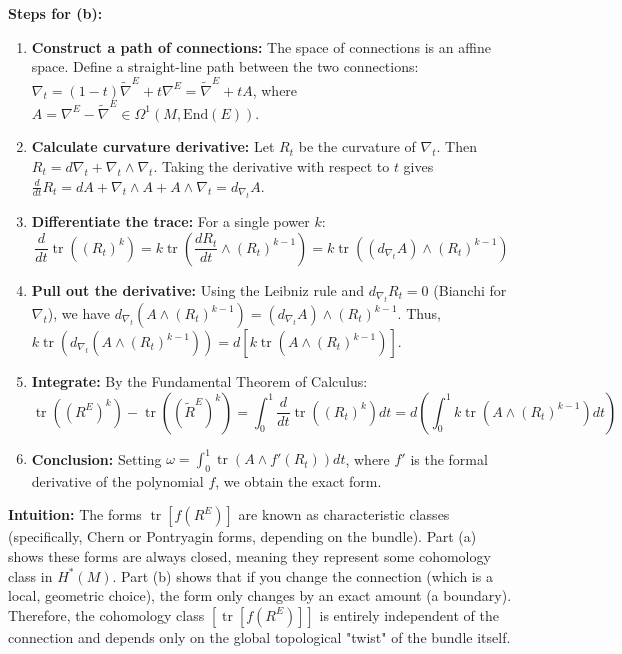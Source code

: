 \begin{solution}
\medskip
\textbf{Steps for (b):}
\begin{enumerate}
    \item \textbf{Construct a path of connections:} The space of connections is an affine space. Define a straight-line path between the two connections: $\nabla_t = (1-t)\widetilde{\nabla}^E + t\nabla^E = \widetilde{\nabla}^E + tA$, where $A = \nabla^E - \widetilde{\nabla}^E \in \Omega^1(M, \text{End}(E))$.
    \item \textbf{Calculate curvature derivative:} Let $R_t$ be the curvature of $\nabla_t$. Then $R_t = d\nabla_t + \nabla_t \wedge \nabla_t$. Taking the derivative with respect to $t$ gives $\frac{d}{dt} R_t = d A + \nabla_t \wedge A + A \wedge \nabla_t = d_{\nabla_t} A$.
    \item \textbf{Differentiate the trace:} For a single power $k$:
    \[
    \frac{d}{dt} \operatorname{tr}((R_t)^k) = k \operatorname{tr}\left( \frac{d R_t}{dt} \wedge (R_t)^{k-1} \right) = k \operatorname{tr}\left( (d_{\nabla_t} A) \wedge (R_t)^{k-1} \right)
    \]
    \item \textbf{Pull out the derivative:} Using the Leibniz rule and $d_{\nabla_t} R_t = 0$ (Bianchi for $\nabla_t$), we have $d_{\nabla_t}(A \wedge (R_t)^{k-1}) = (d_{\nabla_t} A) \wedge (R_t)^{k-1}$.
    Thus, $k \operatorname{tr}(d_{\nabla_t}(A \wedge (R_t)^{k-1})) = d \left[ k \operatorname{tr}(A \wedge (R_t)^{k-1}) \right]$.
    \item \textbf{Integrate:} By the Fundamental Theorem of Calculus:
    \[
    \operatorname{tr}((R^E)^k) - \operatorname{tr}((\widetilde{R}^E)^k) = \int_0^1 \frac{d}{dt} \operatorname{tr}((R_t)^k) dt = d \left( \int_0^1 k \operatorname{tr}(A \wedge (R_t)^{k-1}) dt \right)
    \]
    \item \textbf{Conclusion:} Setting $\omega = \int_0^1 \operatorname{tr}(A \wedge f'(R_t)) dt$, where $f'$ is the formal derivative of the polynomial $f$, we obtain the exact form.
\end{enumerate}

\medskip
\textbf{Intuition:}
The forms $\operatorname{tr}[f(R^E)]$ are known as characteristic classes (specifically, Chern or Pontryagin forms, depending on the bundle). Part (a) shows these forms are always closed, meaning they represent some cohomology class in $H^*(M)$. Part (b) shows that if you change the connection (which is a local, geometric choice), the form only changes by an exact amount (a boundary). Therefore, the cohomology class $[\operatorname{tr}[f(R^E)]]$ is entirely independent of the connection and depends only on the global topological "twist" of the bundle itself.
\end{solution}

